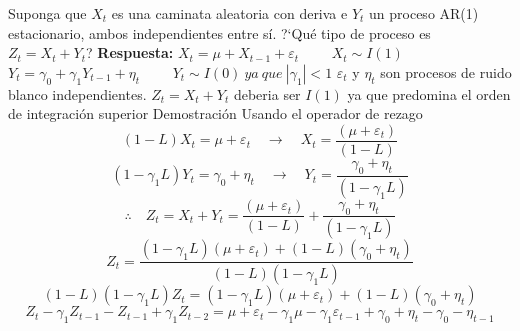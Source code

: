 \documentclass[12pt,letterpaper]{article}
\begin{document}
\begin{itemize}
    Suponga que $X_{t}$ es una caminata aleatoria con deriva e $Y_{t}$ un proceso AR(1) estacionario, ambos independientes entre s\'i. ?`Qu\'e tipo de proceso es $Z_{t}=X_{t}+Y_{t}$?
    \newline
    \newline
    \textbf{Respuesta:}
    \newline
    $X_{t}=\mu+X_{t-1}+\varepsilon_{t}\quad\quad $ $X_{t}\sim I(1)$
    \newline
    $Y_{t}=\gamma_{0}+\gamma_{1}Y_{t-1}+\eta_{t}\quad\quad$ $Y_{t}\sim I(0)~ya~que~|\gamma_{1}|<1$
    \newline
    \newline
    $\varepsilon_{t}$ y $\eta_{t}$ son procesos de ruido blanco independientes.
    \newline
    $Z_{t}=X_{t}+Y_{t}$ deberia ser $I(1)$ ya que predomina el orden de integraci\'on superior
    \newline
    \newline
    Demostraci\'on
    \newline
    Usando el operador de rezago
    \begin{equation*}
       (1-L)X_{t}=\mu+\varepsilon_{t}\quad\rightarrow\quad X_{t}=\frac{(\mu+\varepsilon_{t})}{(1-L)}
    \end{equation*}
    \begin{equation*}
        (1-\gamma_{1}L)Y_{t}=\gamma_{0}+\eta_{t}\quad\rightarrow\quad Y_{t}=\frac{\gamma_{0}+\eta_{t}}{(1-\gamma_{1}L)}
    \end{equation*}
    \begin{equation*}
        \therefore\quad Z_{t}=X_{t}+Y_{t}=\frac{(\mu+\varepsilon_{t})}{(1-L)}+\frac{\gamma_{0}+\eta_{t}}{(1-\gamma_{1}L)}
    \end{equation*}
    \begin{equation*}
        Z_{t}=\frac{(1-\gamma_{1}L)(\mu+\varepsilon_{t})+(1-L)(\gamma_{0}+\eta_{t})}{(1-L)(1-\gamma_{1}L)}
    \end{equation*}
    \begin{equation*}
        (1-L)(1-\gamma_{1}L) Z_{t}=(1-\gamma_{1}L)(\mu+\varepsilon_{t})+(1-L)(\gamma_{0}+\eta_{t})
    \end{equation*}
    \begin{equation*}
        Z_{t}-\gamma_{1}Z_{t-1}-Z_{t-1}+\gamma_{1}Z_{t-2}=\mu+\varepsilon_{t}-\gamma_{1}\mu-\gamma_{1}\varepsilon_{t-1}+\gamma_{0}+\eta_{t}-\gamma_{0}-\eta_{t-1}
    \end{equation*}
    \begin{equation*}

\end{equation*}
\end{itemize}
\end{document}
